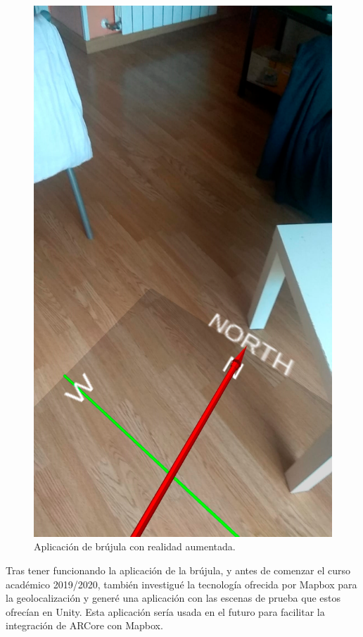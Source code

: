\begin{figure}[H]
    \centering
    \includegraphics[scale=0.13]{Sections/Contribuciones/Imagenes/Brujula.png}
    \caption[Aplicación de brújula con realidad aumentada.]{Aplicación de brújula con realidad aumentada.}
    \label{fig:Brujula}
\end{figure}

Tras tener funcionando la aplicación de la brújula, y antes de comenzar el curso académico 2019/2020, también investigué la tecnología ofrecida por Mapbox para la geolocalización y generé una aplicación con las escenas de prueba que estos ofrecían en Unity. Esta aplicación sería usada en el futuro para facilitar la integración de ARCore con Mapbox.\\

